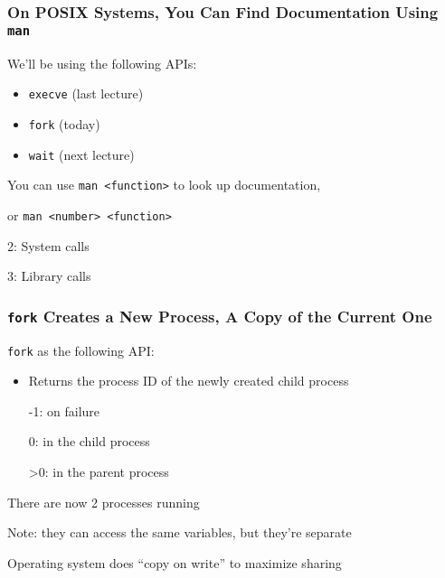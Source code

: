   \begin{frame}
    \frametitle{On POSIX Systems, You Can Find Documentation Using \texttt{man}}

    We'll be using the following APIs:
    \begin{itemize}
      \item \texttt{execve} (last lecture)
      \item \texttt{fork} (today)
      \item \texttt{wait} (next lecture)
    \end{itemize}

    \vspace{2em}

    You can use \texttt{man <function>} to look up documentation,

    or \texttt{man <number> <function>}

    \hspace{2em} 2: System calls

    \hspace{2em} 3: Library calls
  \end{frame}

  \begin{frame}
    \frametitle{\texttt{fork} Creates a New Process, A Copy of the Current One}

    \texttt{fork} as the following API:
    \begin{itemize}
      \item Returns the process ID of the newly created child process

            \hspace{2em} -1: on failure

            \hspace{2em} 0: in the child process

            \hspace{2em} >0: in the parent process
    \end{itemize}

    \vspace{2em}

    There are now 2 processes running

    \hspace{2em} Note: they can access the same variables, but they're separate

    \hspace{4em} Operating system does ``copy on write'' to maximize sharing
  \end{frame}

